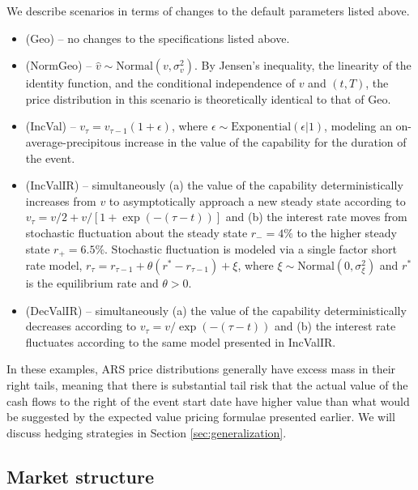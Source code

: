 \documentclass{article}
\begin{document}
We describe scenarios in terms of changes to the default parameters listed above.
\begin{itemize}
    \item (Geo) -- no changes to the specifications listed above.
    \item (NormGeo) -- $\hat v \sim \mathrm{Normal}(v, \sigma^2_{v})$. By Jensen's inequality, the linearity of the identity function, and the conditional independence of $v$ and $(t, T)$, the price distribution in this scenario is theoretically identical to that of Geo.
    \item (IncVal) -- $v_\tau = v_{\tau - 1} (1 + \epsilon)$, where $\epsilon \sim \mathrm{Exponential}(\epsilon | 1)$, modeling an on-average-precipitous increase in the value of the capability for the duration of the event.
    \item (IncValIR) -- simultaneously (a) the value of the capability deterministically increases from $v$ to asymptotically approach a new steady state
    according to $v_\tau = v/2 + v / [1 + \exp(-(\tau - t))]$ and (b) the interest rate moves from stochastic fluctuation about the steady state $r_- = 4\%$ to the higher steady state $r_+ = 6.5\%$. Stochastic fluctuation is modeled via a single factor short rate model, 
    $r_\tau = r_{\tau - 1} + \theta(r^* - r_{\tau - 1}) + \xi$, where $\xi \sim \mathrm{Normal}(0, \sigma^2_{\xi})$ and $r^*$ is the equilibrium rate and $\theta > 0$.
    \item (DecValIR) -- simultaneously (a) the value of the capability deterministically decreases according to $v_\tau = v / \exp(-(\tau - t))$ and (b) the interest rate fluctuates according to the same model presented in IncValIR.
\end{itemize}
In these examples, ARS price distributions generally have excess mass in their right tails, meaning that there is substantial tail risk that the actual value of the cash flows to the right of the event start date have higher value than what would be suggested by the expected value pricing formulae presented earlier.
We will discuss hedging strategies in Section \ref{sec:generalization}.

\subsection{Market structure}\label{sec:market-structure}
\end{document}
